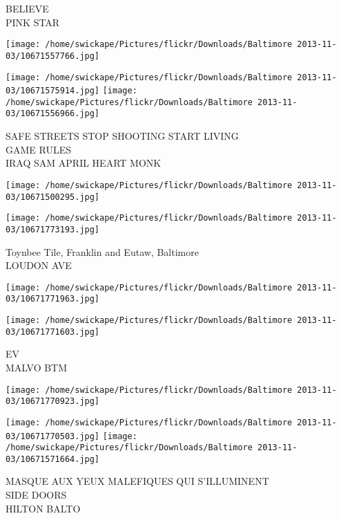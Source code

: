 \documentclass[10pt,letterpaper]{article}
\begin{document}
BELIEVE\\
PINK STAR\\
\pagebreak

\texttt{[image: /home/swickape/Pictures/flickr/Downloads/Baltimore 2013-11-03/10671557766.jpg]}

\vspace{0.25in}
\texttt{[image: /home/swickape/Pictures/flickr/Downloads/Baltimore 2013-11-03/10671575914.jpg]}
\texttt{[image: /home/swickape/Pictures/flickr/Downloads/Baltimore 2013-11-03/10671556966.jpg]}

SAFE STREETS STOP SHOOTING START LIVING\\
GAME RULES\\
IRAQ SAM APRIL HEART MONK\\
\pagebreak

\texttt{[image: /home/swickape/Pictures/flickr/Downloads/Baltimore 2013-11-03/10671500295.jpg]}

\vspace{0.25in}
\texttt{[image: /home/swickape/Pictures/flickr/Downloads/Baltimore 2013-11-03/10671773193.jpg]}

Toynbee Tile, Franklin and Eutaw, Baltimore\\
LOUDON AVE\\
\pagebreak

\texttt{[image: /home/swickape/Pictures/flickr/Downloads/Baltimore 2013-11-03/10671771963.jpg]}

\vspace{0.25in}
\texttt{[image: /home/swickape/Pictures/flickr/Downloads/Baltimore 2013-11-03/10671771603.jpg]}

EV\\
MALVO BTM\\
\pagebreak

\texttt{[image: /home/swickape/Pictures/flickr/Downloads/Baltimore 2013-11-03/10671770923.jpg]}

\vspace{0.25in}
\texttt{[image: /home/swickape/Pictures/flickr/Downloads/Baltimore 2013-11-03/10671770503.jpg]}
\texttt{[image: /home/swickape/Pictures/flickr/Downloads/Baltimore 2013-11-03/10671571664.jpg]}

MASQUE AUX YEUX MALEFIQUES QUI S'ILLUMINENT\\
SIDE DOORS\\
HILTON BALTO\\
\pagebreak
\end{document}
